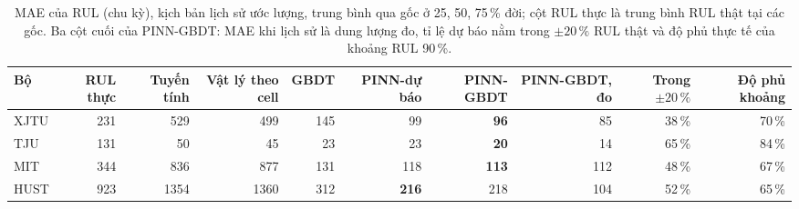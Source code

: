 \begin{table}[!hbp]\centering\small
\caption[MAE của RUL dự báo]{MAE của RUL (chu kỳ), kịch bản lịch sử ước lượng, trung bình qua gốc ở 25, 50, 75\,\% đời; cột RUL thực là trung bình RUL thật tại các gốc. Ba cột cuối của PINN-GBDT: MAE khi lịch sử là dung lượng đo, tỉ lệ dự báo nằm trong $\pm20\,\%$ RUL thật và độ phủ thực tế của khoảng RUL 90\,\%.}\label{tab:e22rul}
\begin{adjustbox}{max width=\textwidth}\begin{tabular}{lrrrrrrrrr}\toprule
Bộ & RUL thực & Tuyến tính & Vật lý theo cell & GBDT & PINN-dự báo & PINN-GBDT & PINN-GBDT, đo & Trong $\pm20\,\%$ & Độ phủ khoảng \\\midrule
XJTU & 231 & 529 & 499 & 145 & 99 & \textbf{96} & 85 & 38\,\% & 70\,\% \\
TJU & 131 & 50 & 45 & 23 & 23 & \textbf{20} & 14 & 65\,\% & 84\,\% \\
MIT & 344 & 836 & 877 & 131 & 118 & \textbf{113} & 112 & 48\,\% & 67\,\% \\
HUST & 923 & 1354 & 1360 & 312 & \textbf{216} & 218 & 104 & 52\,\% & 65\,\% \\
\bottomrule\end{tabular}\end{adjustbox}\end{table}

